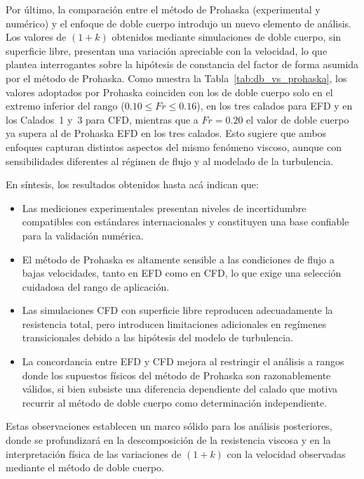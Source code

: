 Por último, la comparación entre el método de Prohaska (experimental y 
numérico) y el enfoque de doble cuerpo introdujo un nuevo elemento de análisis. 
Los valores de $(1+k)$ obtenidos mediante simulaciones de doble cuerpo, sin 
superficie libre, presentan una variación apreciable con la velocidad, lo que 
plantea interrogantes sobre la hipótesis de constancia del factor de forma 
asumida por el método de Prohaska. Como muestra la 
Tabla~\ref{tab:db_vs_prohaska}, los valores adoptados por Prohaska coinciden 
con los de doble cuerpo solo en el extremo inferior del rango 
($0{.}10 \le Fr \le 0{.}16$), en los tres calados para EFD y en los 
Calados~1 y~3 para CFD, mientras que a $Fr = 0{.}20$ el valor de doble cuerpo 
ya supera al de Prohaska EFD en los tres calados. Esto sugiere que ambos 
enfoques capturan distintos aspectos del mismo fenómeno 
viscoso, aunque con sensibilidades diferentes al régimen de flujo y al 
modelado de la turbulencia.

En síntesis, los resultados obtenidos hasta acá indican que:
\begin{itemize}
    \item Las mediciones experimentales presentan niveles de incertidumbre 
    compatibles con estándares internacionales y constituyen una base 
    confiable para la validación numérica.
    \item El método de Prohaska es altamente sensible a las condiciones de 
    flujo a bajas velocidades, tanto en EFD como en CFD, lo que exige una 
    selección cuidadosa del rango de aplicación.
    \item Las simulaciones CFD con superficie libre reproducen adecuadamente 
    la resistencia total, pero introducen limitaciones adicionales en 
    regímenes transicionales debido a las hipótesis del modelo de turbulencia.
    \item La concordancia entre EFD y CFD mejora al restringir el análisis a 
    rangos donde los supuestos físicos del método de Prohaska son razonablemente 
    válidos, si bien subsiste una diferencia dependiente del calado que motiva 
    recurrir al método de doble cuerpo como determinación independiente.
\end{itemize}

Estas observaciones establecen un marco sólido para los análisis posteriores, 
donde se profundizará en la descomposición de la resistencia viscosa y en la 
interpretación física de las variaciones de $(1+k)$ con la velocidad 
observadas mediante el método de doble cuerpo.

